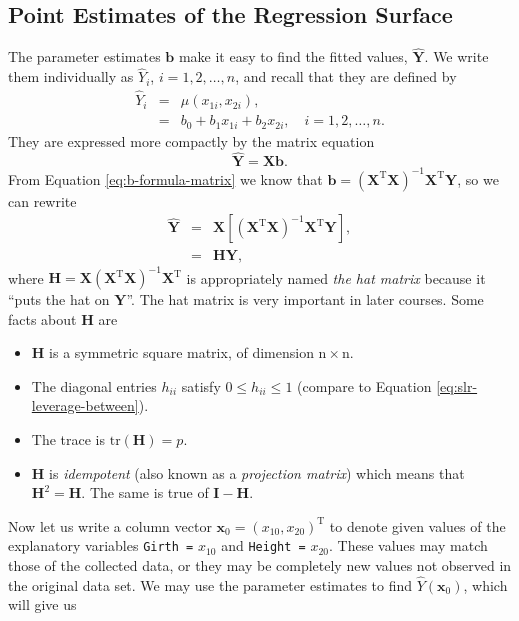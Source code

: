 \documentclass[captions=tableheading]{scrbook}
\begin{document}
\subsection{Point Estimates of the Regression Surface}
\label{sec-1-2-2}

\label{sub:mlr-point-est-regsurface}

The parameter estimates $\mathbf{b}$ make it easy to find the fitted values, $\hat{\mathbf{Y}}$. We write them individually as $\hat{Y}_{i}$, $i=1,2,\ldots,n$, and recall that they are defined by
\begin{eqnarray}
\hat{Y}_{i} & = & \hat{\mu}(x_{1i},x_{2i}),\\
 & = & b_{0}+b_{1}x_{1i}+b_{2}x_{2i},\quad i=1,2,\ldots,n.
\end{eqnarray}
They are expressed more compactly by the matrix equation
\begin{equation}
\hat{\mathbf{Y}}=\mathbf{X}\mathbf{b}.
\end{equation}
From Equation \ref{eq:b-formula-matrix} we know that $\mathbf{b}=\left(\mathbf{X}^{\mathrm{T}}\mathbf{X}\right)^{-1}\mathbf{X}^{\mathrm{T}}\mathbf{Y}$, so we can rewrite
\begin{eqnarray}
\hat{\mathbf{Y}} & = & \mathbf{X}\left[\left(\mathbf{X}^{\mathrm{T}}\mathbf{X}\right)^{-1}\mathbf{X}^{\mathrm{T}}\mathbf{Y}\right],\\
 & = & \mathbf{H}\mathbf{Y},
\end{eqnarray}
where $\mathbf{H}=\mathbf{X}\left(\mathbf{X}^{\mathrm{T}}\mathbf{X}\right)^{-1}\mathbf{X}^{\mathrm{T}}$ is appropriately named \emph{the hat matrix} because it ``puts the hat on $\mathbf{Y}$''. The hat matrix is very important in later courses. Some facts about $\mathbf{H}$ are
\begin{itemize}
\item $\mathbf{H}$ is a symmetric square matrix, of dimension $\mathrm{n}\times\mathrm{n}$.
\item The diagonal entries $h_{ii}$ satisfy $0\leq h_{ii}\leq1$ (compare to Equation \ref{eq:slr-leverage-between}).
\item The trace is $\mathrm{tr}(\mathbf{H})=p$.
\item $\mathbf{H}$ is \emph{idempotent} (also known as a \emph{projection matrix}) which means that $\mathbf{H}^{2}=\mathbf{H}$. The same is true of $\mathbf{I}-\mathbf{H}$.
\end{itemize}

Now let us write a column vector $\mathbf{x}_{0}=(x_{10},x_{20})^{\mathrm{T}}$ to denote given values of the explanatory variables \texttt{Girth =} $x_{10}$ and \texttt{Height =} $x_{20}$. These values may match those of the collected data, or they may be completely new values not observed in the original data set. We may use the parameter estimates to find $\hat{Y}(\mathbf{x}_{0})$, which will give us
\end{document}
